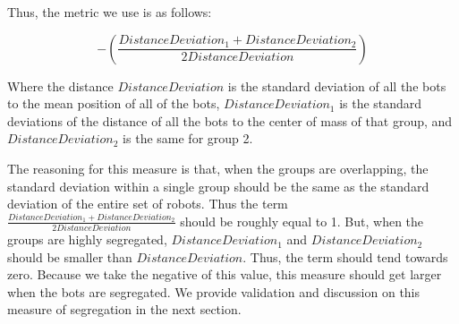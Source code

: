 Thus, the metric we use is as follows:

$$
-({\frac{DistanceDeviation_1 + DistanceDeviation_2}{2 DistanceDeviation}})
$$

Where the distance $DistanceDeviation$ is the standard deviation of all the bots to the mean position of all of the bots, $DistanceDeviation_1$ is the standard deviations of the distance of all the bots to the center of mass of that group, and $DistanceDeviation_2$ is the same for group 2. 

The reasoning for this measure is that, when the groups are overlapping, the standard deviation within a single group should be the same as the standard deviation of the entire set of robots. 
Thus the term $\frac{DistanceDeviation_1 + DistanceDeviation_2}{2 DistanceDeviation}$ should be roughly equal to 1. 
But, when the groups are highly segregated, $DistanceDeviation_1$ and $DistanceDeviation_2$ should be smaller than $DistanceDeviation$. 
Thus, the term should tend towards zero. 
Because we take the negative of this value, this measure should get larger when the bots are segregated. 
We provide validation and discussion on this measure of segregation in the next section.
